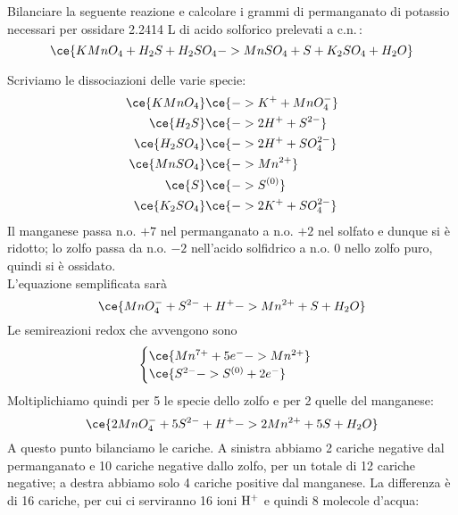 \begin{esercizio}
    Bilanciare la seguente reazione e calcolare i grammi di permanganato di potassio necessari per ossidare 2.2414 L di acido solforico prelevati a c.n.\,:
    $$\ce{KMnO_4 + H_2S + H_2SO_4 -> MnSO_4 + S + K_2SO_4 + H_2O}$$
\end{esercizio}
\begin{soluzione}
    Scriviamo le dissociazioni delle varie specie:
    \begin{equation*}
        \begin{split}
            \ce{KMnO_4} & \ce{-> K^+ + MnO_4^-}
            \\
            \ce{H_2S} & \ce{-> 2H^+ + S^{2-}}
            \\
            \ce{H_2SO_4} & \ce{-> 2H^+ + SO_4^{2-}}
            \\
            \ce{MnSO_4} & \ce{-> Mn^{2+}}
            \\
            \ce{S} & \ce{-> S^{(0)}}
            \\
            \ce{K_2SO_4} & \ce{-> 2K^+ + SO_4^{2-}}
            \\
        \end{split}
    \end{equation*}
    Il manganese passa n.o. $+7$ nel permanganato a n.o. $+2$ nel solfato e dunque si è ridotto; lo zolfo passa da n.o. $-2$ nell'acido solfidrico a n.o. $0$ nello zolfo puro, quindi si è ossidato.\\
    L'equazione semplificata sarà
    \begin{equation*}
        \ce{MnO_4^- + S^{2-} + H^+ -> Mn^{2+} + S + H_2O}
    \end{equation*}
    Le semireazioni redox che avvengono sono
    \begin{equation*}
        \begin{cases}
            \ce{Mn^{7+} + 5e^- -> Mn^{2+}}\\
            \ce{S^{2-} -> S^{(0)} + 2e^-}
        \end{cases}
    \end{equation*}
    Moltiplichiamo quindi per 5 le specie dello zolfo e per 2 quelle del manganese:
    \begin{equation*}
        \ce{2MnO_4^- + 5S^{2-} + H^+ -> 2Mn^{2+} + 5S + H_2O}
    \end{equation*}
    A questo punto bilanciamo le cariche. A sinistra abbiamo 2 cariche negative dal permanganato e 10 cariche negative dallo zolfo, per un totale di 12 cariche negative; a destra abbiamo solo 4 cariche positive dal manganese. La differenza è di 16 cariche, per cui ci serviranno 16 ioni $\rm H^+$ e quindi 8 molecole d'acqua:

\end{soluzione}
